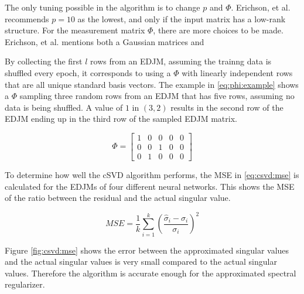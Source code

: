 The only tuning possible in the algorithm is to change $p$ and $\Phi$. Erichson, et al. recommends $p=10$ as the lowest, and only if the input matrix has a low-rank structure. For the measurement matrix $\Phi$, there are more choices to be made. Erichson, et al. mentions both a Gaussian matrices and 


By collecting the first $l$ rows from an EDJM, assuming the trainng data is shuffled every epoch, it corresponds to using a $\Phi$ with linearly independent rows that are all unique standard basis vectors. The example in \eqref{eq:phi:example} shows a $\Phi$ sampling three random rows from an EDJM that has five rows, assuming no data is being shuffled. A value of $1$ in $(3,2)$ results in the second row of the EDJM ending up in the third row of the sampled EDJM matrix.


\begin{equation} \label{eq:phi:example}
    \Phi =
    \begin{bmatrix}
    1 & 0 & 0 & 0 & 0 \\
    0 & 0 & 1 & 0 & 0 \\
    0 & 1 & 0 & 0 & 0
    \end{bmatrix}
\end{equation}



To determine how well the cSVD algorithm performs, the MSE in \eqref{eq:csvd:mse} is calculated for the EDJMs of four different neural networks. This shows the MSE of the ratio between the residual and the actual singular value.

\begin{equation} \label{eq:csvd:mse}
    MSE = \frac{1}{k}\sum_{i=1}^k \left ( \frac{\hat \sigma_{i} - \sigma_i}{\sigma_i} \right )^2
\end{equation}

Figure \ref{fig:csvd:mse} shows the error between the approximated singular values and the actual singular values is very small compared to the actual singular values. Therefore the algorithm is accurate enough for the approximated spectral regularizer.